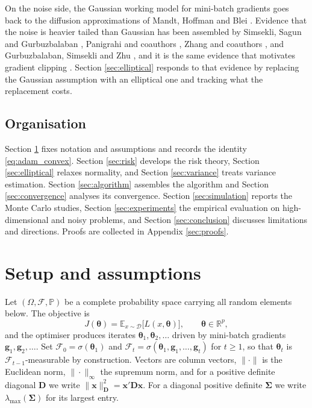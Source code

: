 \documentclass[pdflatex,sn-mathphys-num]{sn-jnl}%
\theoremstyle{thmstyleone}%
\theoremstyle{thmstyletwo}%
\theoremstyle{thmstylethree}%
\newcommand{\E}{\mathbb{E}}
\newcommand{\Real}{\mathbb{R}}
\begin{document}
On the noise side, the Gaussian working model for mini-batch gradients goes back to the diffusion approximations of Mandt, Hoffman and Blei \cite{mandt2017}. Evidence that the noise is heavier tailed than Gaussian has been assembled by Simsekli, Sagun and Gurbuzbalaban \cite{simsekli2019}, Panigrahi and coauthors \cite{panigrahi2019}, Zhang and coauthors \cite{zhang2020attention}, and Gurbuzbalaban, Simsekli and Zhu \cite{gurbuzbalaban2021}, and it is the same evidence that motivates gradient clipping \cite{zhang2020clipping}. Section \ref{sec:elliptical} responds to that evidence by replacing the Gaussian assumption with an elliptical one and tracking what the replacement costs.

\subsection{Organisation}

Section \ref{sec:setup} fixes notation and assumptions and records the identity \eqref{eq:adam_convex}. Section \ref{sec:risk} develops the risk theory, Section \ref{sec:elliptical} relaxes normality, and Section \ref{sec:variance} treats variance estimation. Section \ref{sec:algorithm} assembles the algorithm and Section \ref{sec:convergence} analyses its convergence. Section \ref{sec:simulation} reports the Monte Carlo studies, Section \ref{sec:experiments} the empirical evaluation on high-dimensional and noisy problems, and Section \ref{sec:conclusion} discusses limitations and directions. Proofs are collected in Appendix \ref{sec:proofs}.

\section{Setup and assumptions}
\label{sec:setup}

Let $(\Omega,\mathcal F,\mathbb P)$ be a complete probability space carrying all random elements below. The objective is
\begin{equation}
J(\bm\theta)=\E_{x\sim\mathcal D}\bigl[L(x,\bm\theta)\bigr],
\qquad
\bm\theta\in\Real^{p},
\end{equation}
and the optimiser produces iterates $\bm\theta_1,\bm\theta_2,\dots$ driven by mini-batch gradients $\bm g_1,\bm g_2,\dots$. Set $\mathcal F_0=\sigma(\bm\theta_1)$ and $\mathcal F_t=\sigma(\bm\theta_1,\bm g_1,\dots,\bm g_t)$ for $t\ge1$, so that $\bm\theta_t$ is $\mathcal F_{t-1}$-measurable by construction. Vectors are column vectors, $\|\cdot\|$ is the Euclidean norm, $\|\cdot\|_\infty$ the supremum norm, and for a positive definite diagonal $\bm D$ we write $\|\bm x\|^2_{\bm D}=\bm x'\bm D\bm x$. For a diagonal positive definite $\bm\Sigma$ we write $\lambda_{\max}(\bm\Sigma)$ for its largest entry.
\end{document}
